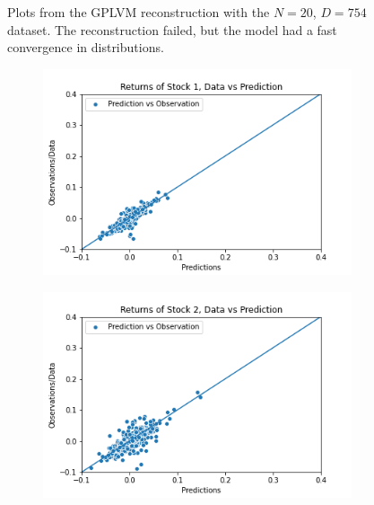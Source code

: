 \begin{figure}
\begin{subfigure}[r]{0.3\textwidth}
	\end{subfigure}
	\caption[Y-$\hat{Y}$ pair plots for N=20 with the GPLVM model]{Plots from the GPLVM reconstruction with the $N=20$, $D=754$ dataset. The reconstruction failed, but the model had a fast convergence in distributions. }
	\label{fig:gplvm_N20_pairs}
\end{figure}
\begin{figure}%
	\centering
	\begin{subfigure}[l]{0.3\textwidth}
		\includegraphics[width=\textwidth]{img/07_0/N60/Q1_kernel1_stock1_scatter.png}
	\end{subfigure}
	\begin{subfigure}[c]{0.3\textwidth}
		\includegraphics[width=\textwidth]{img/07_0/N60/Q1_kernel1_stock2_scatter.png}
	\end{subfigure}
	\begin{subfigure}[r]{0.3\textwidth}

\end{subfigure}
\end{figure}
